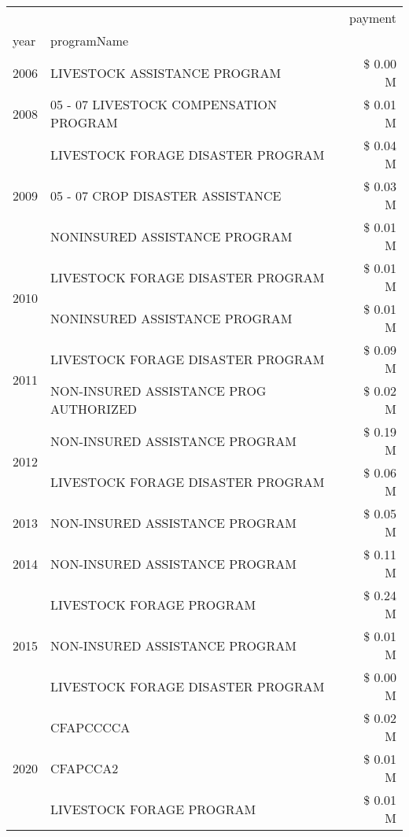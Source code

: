 \begin{tabular}{llr}
\toprule
 &  & payment \\
year & programName &  \\
\midrule
2006 & LIVESTOCK ASSISTANCE PROGRAM & \$ 0.00 M \\
\cline{1-3}
2008 & 05 - 07 LIVESTOCK COMPENSATION PROGRAM & \$ 0.01 M \\
\cline{1-3}
\multirow[t]{3}{*}{2009} & LIVESTOCK FORAGE DISASTER  PROGRAM & \$ 0.04 M \\
 & 05 - 07 CROP DISASTER ASSISTANCE & \$ 0.03 M \\
 & NONINSURED ASSISTANCE PROGRAM & \$ 0.01 M \\
\cline{1-3}
\multirow[t]{2}{*}{2010} & LIVESTOCK FORAGE DISASTER  PROGRAM & \$ 0.01 M \\
 & NONINSURED ASSISTANCE PROGRAM & \$ 0.01 M \\
\cline{1-3}
\multirow[t]{2}{*}{2011} & LIVESTOCK FORAGE DISASTER PROGRAM & \$ 0.09 M \\
 & NON-INSURED ASSISTANCE PROG AUTHORIZED & \$ 0.02 M \\
\cline{1-3}
\multirow[t]{2}{*}{2012} & NON-INSURED ASSISTANCE PROGRAM & \$ 0.19 M \\
 & LIVESTOCK FORAGE DISASTER PROGRAM & \$ 0.06 M \\
\cline{1-3}
2013 & NON-INSURED ASSISTANCE PROGRAM & \$ 0.05 M \\
\cline{1-3}
2014 & NON-INSURED ASSISTANCE PROGRAM & \$ 0.11 M \\
\cline{1-3}
\multirow[t]{3}{*}{2015} & LIVESTOCK FORAGE PROGRAM & \$ 0.24 M \\
 & NON-INSURED ASSISTANCE PROGRAM & \$ 0.01 M \\
 & LIVESTOCK FORAGE DISASTER PROGRAM & \$ 0.00 M \\
\cline{1-3}
\multirow[t]{3}{*}{2020} & CFAPCCCCA & \$ 0.02 M \\
 & CFAPCCA2 & \$ 0.01 M \\
 & LIVESTOCK FORAGE PROGRAM & \$ 0.01 M \\
\cline{1-3}
\bottomrule
\end{tabular}
